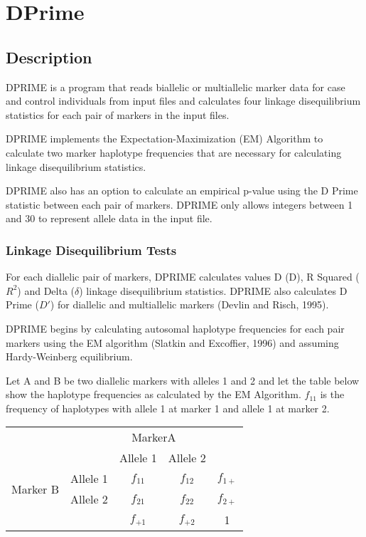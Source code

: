 
\section{DPrime}
\label{sec:dprime}

\subsection{Description}

DPRIME is a program that reads biallelic or multiallelic marker data for case
and control individuals from input files and calculates four linkage
disequilibrium statistics for each pair of markers in the input files.

DPRIME implements the Expectation-Maximization (EM) Algorithm to calculate two
marker haplotype frequencies that are necessary for calculating linkage
disequilibrium statistics.

DPRIME also has an option to calculate an empirical p-value using the D Prime
statistic between each pair of markers.  DPRIME only allows integers between 1
and 30 to represent allele data in the input file.

\subsubsection{Linkage Disequilibrium Tests}
\label{susub:linkage_dis}

For each diallelic pair of markers, DPRIME calculates values D (D), R Squared
($R^2$) and Delta ($\delta$) linkage disequilibrium statistics.  DPRIME also
calculates D Prime ($D'$) for diallelic and multiallelic markers (Devlin and
Risch, 1995).

DPRIME begins by calculating autosomal haplotype frequencies for each pair
markers using the EM algorithm (Slatkin and Excoffier, 1996) and assuming
Hardy-Weinberg equilibrium.

Let A and B be two diallelic markers with alleles 1 and 2 and let the table
below show the haplotype frequencies as calculated by the EM Algorithm.  $f_{11}$ is the
frequency of haplotypes with allele 1 at marker 1 and allele 1 at marker 2.

\vspace{1em}
\begin{tabular}[!h]{ccccc}
  \hline
  & \multicolumn{4}{c}{MarkerA} \\
  \cline{2-5}
  \multirow{4}{*}{Marker B} & & Allele 1 & Allele 2 & \\
  & Allele 1 & $f_{11}$ & $f_{12}$ & $f_{1+}$ \\
  & Allele 2 & $f_{21}$ & $f_{22}$ & $f_{2+}$ \\
  &          & $f_{+1}$ & $f_{+2}$ & 1 \\
  \hline
\end{tabular}
\vspace{1em}

